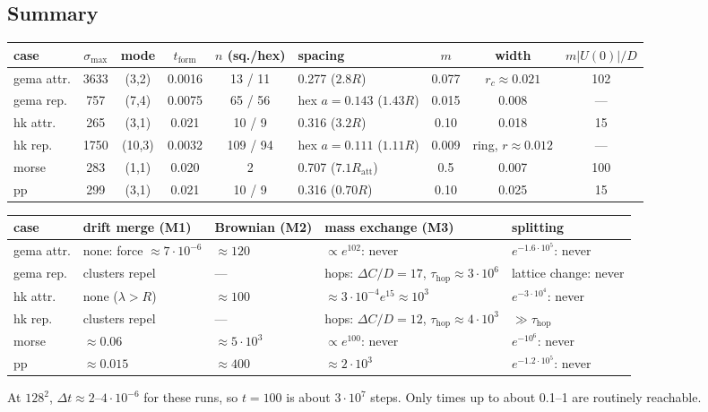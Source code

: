 \documentclass[11pt]{article}
\newcommand{\tf}{t_{\mathrm{form}}}
\begin{document}
\subsection{Summary}
\begin{center}
\small
\begin{tabularx}{\textwidth}{@{}l c c c c L c c c@{}}
\toprule
case & $\sigma_{\max}$ & mode & $\tf$ & $n$ (sq./hex) & spacing & $m$ & width & $m|U(0)|/D$ \\
\midrule
gema attr. & 3633 & (3,2) & 0.0016 & 13 / 11 & 0.277 ($2.8R$) & 0.077 & $r_c\approx0.021$ & 102 \\
gema rep. & 757 & (7,4) & 0.0075 & 65 / 56 & hex $a=0.143$ ($1.43R$) & 0.015 & 0.008 & --- \\
hk attr. & 265 & (3,1) & 0.021 & 10 / 9 & 0.316 ($3.2R$) & 0.10 & 0.018 & 15 \\
hk rep. & 1750 & (10,3) & 0.0032 & 109 / 94 & hex $a=0.111$ ($1.11R$) & 0.009 & ring, $r\approx0.012$ & --- \\
morse & 283 & (1,1) & 0.020 & 2 & 0.707 ($7.1R_{\mathrm{att}}$) & 0.5 & 0.007 & 100 \\
pp & 299 & (3,1) & 0.021 & 10 / 9 & 0.316 ($0.70R$) & 0.10 & 0.025 & 15 \\
\bottomrule
\end{tabularx}

\medskip
\begin{tabularx}{\textwidth}{@{}l L L L L@{}}
\toprule
case & drift merge (M1) & Brownian (M2) & mass exchange (M3) & splitting \\
\midrule
gema attr. & none: force $\approx7\cdot10^{-6}$ & $\approx120$ & $\propto e^{102}$: never & $e^{-1.6\cdot10^5}$: never \\
gema rep. & clusters repel & --- & hops: $\Delta C/D=17$, $\tau_{\mathrm{hop}}\approx3\cdot10^6$ & lattice change: never \\
hk attr. & none ($\lambda>R$) & $\approx100$ & $\approx3\cdot10^{-4}e^{15}\approx10^3$ & $e^{-3\cdot10^4}$: never \\
hk rep. & clusters repel & --- & hops: $\Delta C/D=12$, $\tau_{\mathrm{hop}}\approx4\cdot10^3$ & $\gg\tau_{\mathrm{hop}}$ \\
morse & $\approx0.06$ & $\approx5\cdot10^3$ & $\propto e^{100}$: never & $e^{-10^6}$: never \\
pp & $\approx0.015$ & $\approx400$ & $\approx2\cdot10^3$ & $e^{-1.2\cdot10^5}$: never \\
\bottomrule
\end{tabularx}
\end{center}
At $128^2$, $\Delta t\approx2$--$4\cdot10^{-6}$ for these runs, so $t=100$ is
about $3\cdot10^7$ steps. Only times up to about 0.1--1 are routinely
reachable.
\end{document}
